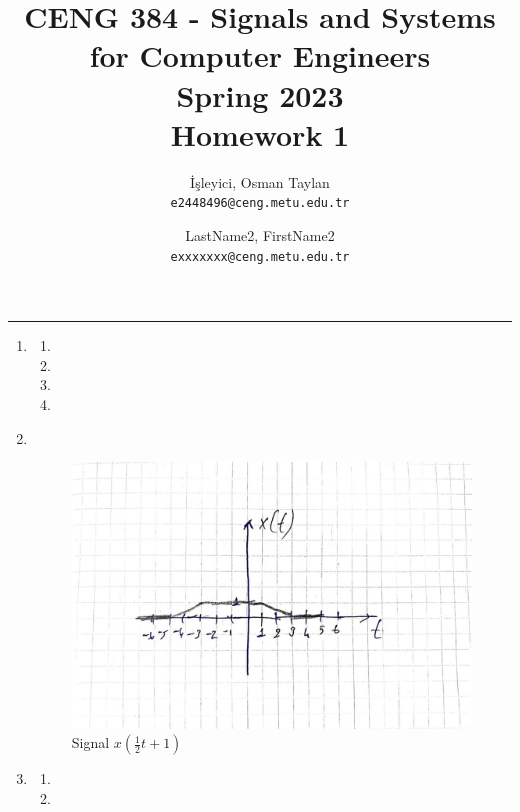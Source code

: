 \documentclass[10pt,a4paper, margin=1in]{article}
\author{
  İşleyici, Osman Taylan\\
  \texttt{e2448496@ceng.metu.edu.tr}
  \and
  LastName2, FirstName2\\
  \texttt{exxxxxxx@ceng.metu.edu.tr}
}
\title{CENG 384 - Signals and Systems for Computer Engineers \\
Spring 2023 \\
Homework 1}
\begin{document}
\maketitle



\noindent\rule{19cm}{1.2pt}

\begin{enumerate}

    \item %
          \begin{enumerate}
              \item %
              \item %
              \item %
              \item %
          \end{enumerate}

    \item ~\\
          \begin{figure}[H]
            \centering
            \includegraphics[scale=0.25]{handwritten_signal.jpeg}
            \caption{Signal $x(\frac{1}{2}t+1)$}
          \end{figure}

    \item %
          \begin{enumerate}
              \item %
              \item %
          \end{enumerate}


\end{enumerate}
\end{document}
